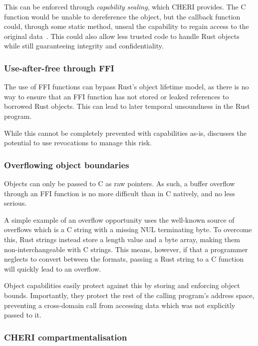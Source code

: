 \documentclass[dissertation.tex]{subfiles}
\begin{document}
This can be enforced through \emph{capability sealing}, which CHERI
provides.
The C function would be unable to dereference the object, but the
callback function could, through some static method, unseal the
capability to regain access to the original data~\cite{cheri-v6}.
This could also allow less trusted code to handle Rust objects while
still guaranteeing integrity and confidentiality.

\subsubsection{Use-after-free through FFI}
The use of FFI functions can bypass Rust's object lifetime model, as
there is no way to ensure that an FFI function has not stored or leaked
references to borrowed Rust objects.
This can lead to later temporal unsoundness in the Rust program.

While this cannot be completely prevented with capabilities as-is,
 discusses the potential to use revocations
to manage this risk.

\subsubsection{Overflowing object boundaries}

Objects can only be passed to C as raw pointers.
As such, a buffer overflow through an FFI function is no more difficult
than in C natively, and no less serious.

A simple example of an overflow opportunity uses the well-known source
of overflows which is a C string with a missing NUL terminating byte.
To overcome this, Rust strings instead store a length value and a byte
array, making them non-interchangeable with C strings.
This means, however, if that a programmer neglects to convert between
the formats, passing a Rust string to a C function will quickly lead to
an overflow.

Object capabilities easily protect against this by storing and enforcing
object bounds.
Importantly, they protect the rest of the calling program's address
space, preventing a cross-domain call from accessing data which was not
explicitly passed to it.

\subsubsection{CHERI compartmentalisation}
\end{document}

